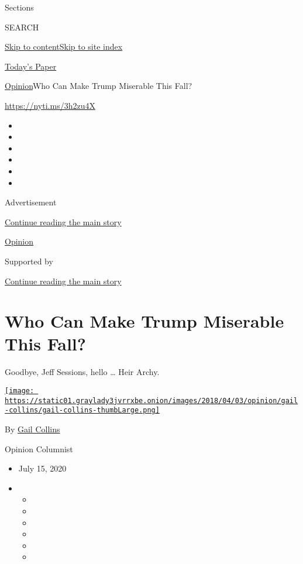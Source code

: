 Sections

SEARCH

\protect\hyperlink{site-content}{Skip to
content}\protect\hyperlink{site-index}{Skip to site index}

\href{https://myaccount.nytimes3xbfgragh.onion/auth/login?response_type=cookie\&client_id=vi}{}

\href{https://www.nytimes3xbfgragh.onion/section/todayspaper}{Today's
Paper}

\href{/section/opinion}{Opinion}\textbar{}Who Can Make Trump Miserable
This Fall?

\url{https://nyti.ms/3h2zu4X}

\begin{itemize}
\item
\item
\item
\item
\item
\item
\end{itemize}

Advertisement

\protect\hyperlink{after-top}{Continue reading the main story}

\href{/section/opinion}{Opinion}

Supported by

\protect\hyperlink{after-sponsor}{Continue reading the main story}

\hypertarget{who-can-make-trump-miserable-this-fall}{%
\section{Who Can Make Trump Miserable This
Fall?}\label{who-can-make-trump-miserable-this-fall}}

Goodbye, Jeff Sessions, hello \ldots{} Heir Archy.

\href{https://www.nytimes3xbfgragh.onion/by/gail-collins}{\texttt{[image: https://static01.graylady3jvrrxbe.onion/images/2018/04/03/opinion/gail-collins/gail-collins-thumbLarge.png]}}

By \href{https://www.nytimes3xbfgragh.onion/by/gail-collins}{Gail
Collins}

Opinion Columnist

\begin{itemize}
\item
  July 15, 2020
\item
  \begin{itemize}
  \item
  \item
  \item
  \item
  \item
  \item
  \end{itemize}
\end{itemize}

